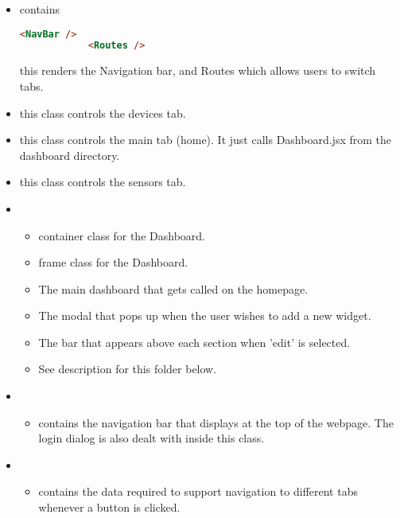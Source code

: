 \documentclass[12pt, titlepage, a4paper]{article}
\begin{document}
\begin{itemize}
    \item {} contains
        \begin{lstlisting}[language=HTML]
            <NavBar />
            <Routes />
        \end{lstlisting}
        
        this renders the Navigation bar, and Routes which allows users to switch tabs.

    \item {} this class controls the devices tab.
    \item {} this class controls the main tab (home). It just calls Dashboard.jsx from the dashboard directory.
    \item {} this class controls the sensors tab.
    \item {}
        \begin{itemize}
            \item {} container class for the Dashboard. 
            \item {} frame class for the Dashboard.
            \item {} The main dashboard that gets called on the homepage.
            \item {} The modal that pops up when the user wishes to add a new widget.
            \item {} The bar that appears above each section when 'edit' is selected.
            \item {} See description for this folder below.
        \end{itemize}
    \item {}
        \begin{itemize}
            \item {} contains the navigation bar that displays at the top of the webpage. The login dialog is also dealt with inside this class.
        \end{itemize}
    \item {}
        \begin{itemize}
            \item {} contains the data required to support navigation to different tabs whenever a button is clicked. 
        \end{itemize}

\end{itemize}
\end{document}
